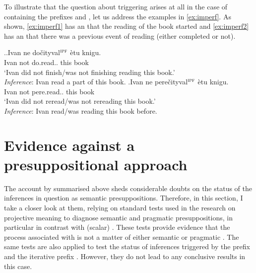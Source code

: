 
To illustrate that the question about  triggering arises at all in the case of  containing the prefixes  and , let us address the examples in \ref{ex:imperf}. As shown,  \ref{ex:imperf1} has an  that the reading of the book started and \ref{ex:imperf2} has an  that there was a previous event of reading (either completed or not).

\ex.\label{ex:imperf}\ag.\label{ex:imperf1}Ivan ne do\v{c}ityval$^{\textsc{ipf}}$ \`{e}tu knigu.\\
Ivan not do.read.. this book\\
\trans `Ivan did not finish/was not finishing reading this book.'\\
\textit{Inference}: Ivan read a part of this book.
\bg.\label{ex:imperf2}Ivan ne pere\v{c}ityval$^{\textsc{ipf}}$ \`{e}tu knigu.\\
Ivan not pere.read.. this book\\
\trans `Ivan did not reread/was not rereading this book.'\\
\textit{Inference}: Ivan read/was reading this book before.

\section{Evidence against a presuppositional approach}\label{sec:pragm:tests}
The account by \citet{Gronn:04, Gronn:06} summarised above sheds considerable doubts on the status of the inferences in question as semantic presuppositions. Therefore, in this section, I take a closer look at them, relying on standard tests used in the research on projective meaning to diagnose semantic and pragmatic presuppositions, in particular in contrast with (scalar) . These tests provide evidence that the process  associated with  is not a matter of either semantic or pragmatic . The same tests are also applied to test the status of inferences triggered by the  prefix  and the iterative prefix . However, they do not lead to any conclusive results in this case.
